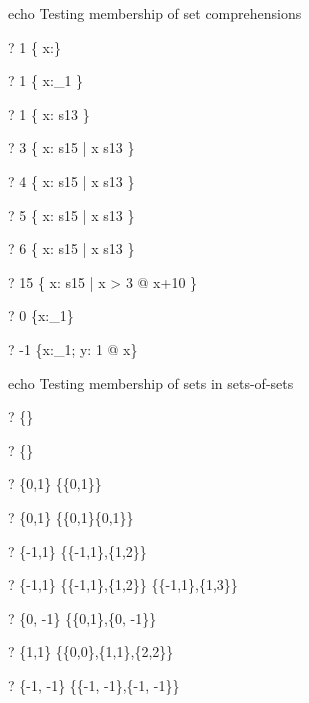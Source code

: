 echo     Testing membership of set comprehensions
\begin{zed} \vdash?  1 \in    \{ x:\nat \} \end{zed}
\begin{zed} \vdash?  1 \in    \{ x:\nat_1 \} \end{zed}
\begin{zed} \vdash?  1 \in    \{ x: s13 \} \end{zed}
\begin{zed} \vdash?  3 \notin \{ x: s15 | x \notin s13 \} \end{zed}
\begin{zed} \vdash?  4 \in    \{ x: s15 | x \notin s13 \} \end{zed}
\begin{zed} \vdash?  5 \in    \{ x: s15 | x \notin s13 \} \end{zed}
\begin{zed} \vdash?  6 \notin \{ x: s15 | x \notin s13 \} \end{zed}
\begin{zed} \vdash?  15 \in   \{ x: s15 | x > 3 @ x+10 \} \end{zed}
\begin{zed} \vdash?  0 \notin \{x:\nat_1\} \end{zed}
\begin{zed} \vdash?  -1 \notin \{x:\nat_1; y: 1  @ x\} \end{zed}


echo     Testing membership of sets in sets-of-sets
\begin{zed} \vdash?  \emptyset \in \{\emptyset\} \end{zed}
\begin{zed} \vdash?  \emptyset \in \{\emptyset \cap \emptyset\} \end{zed}
\begin{zed} \vdash?  \{0,1\} \in \{\{0,1\}\} \end{zed}
\begin{zed} \vdash?  \{0,1\} \in \{\{0,1\}\cap\{0,1\}\} \end{zed}
\begin{zed} \vdash?  \{-1,1\} \in \{\{-1,1\},\{1,2\}\} \end{zed}
\begin{zed} \vdash?  \{-1,1\} \in \{\{-1,1\},\{1,2\}\} \cap \{\{-1,1\},\{1,3\}\} \end{zed}
\begin{zed} \vdash?  \{0, -1\} \in \{\{0,1\},\{0, -1\}\} \end{zed}
\begin{zed} \vdash?  \{1,1\} \in \{\{0,0\},\{1,1\},\{2,2\}\} \end{zed}
\begin{zed} \vdash?  \{-1, -1\} \in \{\{-1, -1\},\{-1, -1\}\} \end{zed}

